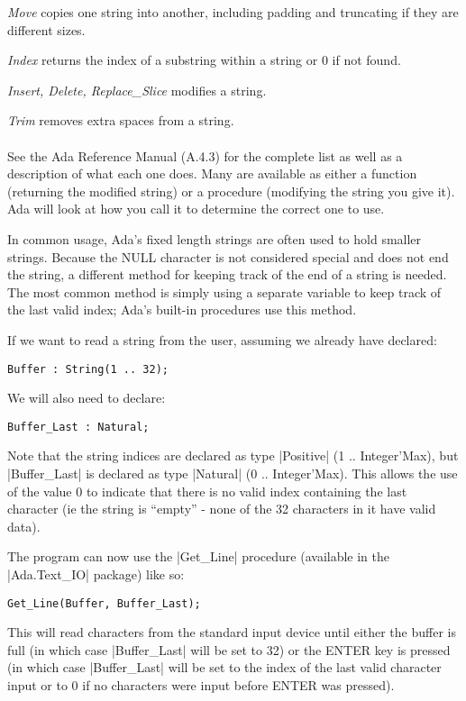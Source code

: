 \emph{Move} copies one string into another, including padding and truncating if they are
different sizes.

\emph{Index} returns the index of a substring within a string or 0 if not found.

\emph{Insert, Delete, Replace\_Slice} modifies a string.

\emph{Trim} removes extra spaces from a string.
\\\\ %
See the Ada Reference Manual (A.4.3) for the complete list as well as a description of what each
one does. Many are available as either a function (returning the modified string) or a procedure
(modifying the string you give it). Ada will look at how you call it to determine the correct
one to use.

In common usage, Ada's fixed length strings are often used to hold smaller strings. Because the
NULL character is not considered special and does not end the string, a different method for
keeping track of the end of a string is needed. The most common method is simply using a
separate variable to keep track of the last valid index; Ada's built-in procedures use this
method.

If we want to read a string from the user, assuming we already have declared:

\begin{lstlisting}
Buffer : String(1 .. 32);
\end{lstlisting}

\noindent We will also need to declare:

\begin{lstlisting}
Buffer_Last : Natural;
\end{lstlisting}

\noindent Note that the string indices are declared as type |Positive| (1 .. Integer'Max), but
|Buffer_Last| is declared as type |Natural| (0 .. Integer'Max). This allows the use of the value
0 to indicate that there is no valid index containing the last character (ie the string is
``empty'' - none of the 32 characters in it have valid data).

The program can now use the |Get_Line| procedure (available in the |Ada.Text_IO| package) like
so:

\begin{lstlisting}
Get_Line(Buffer, Buffer_Last);
\end{lstlisting}

\noindent This will read characters from the standard input device until either the buffer is
full (in which case |Buffer_Last| will be set to 32) or the ENTER key is pressed (in which case
|Buffer_Last| will be set to the index of the last valid character input or to 0 if no
characters were input before ENTER was pressed).

